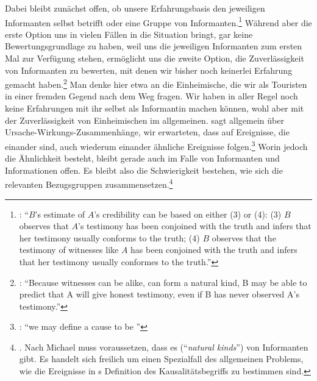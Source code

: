 Dabei bleibt zunächst offen, ob unsere Erfahrungsbasis den jeweiligen
Informanten selbst betrifft oder eine Gruppe von
Informanten.\footnote{\cite[Vgl.][20]{Root:HumeontheVirtuesofTestimony2001}:
\enquote{$B$’s estimate of $A$’s credibility can be based on either (3) or (4):
(3) $B$ observes that $A$’s testimony has been conjoined with the truth and
infers that her testimony usually conforms to the truth; (4) $B$ observes that
the testimony of witnesses like $A$ has been conjoined with the truth and infers
that her testimony usually conformes to the truth.}} Während aber die erste
Option uns in vielen Fällen in die Situation bringt, gar keine
Bewertungsgrundlage zu haben, weil uns die jeweiligen Informanten zum ersten Mal
zur Verfügung stehen, ermöglicht uns die zweite Option, die
Zuverlässigkeit von Informanten zu bewerten, mit denen wir bisher noch keinerlei
Erfahrung gemacht
haben.\footnote{\cite[Vgl.][20]{Root:HumeontheVirtuesofTestimony2001}:
\enquote{Because witnesses can be alike, can form a natural kind, B may be able
to predict that A will give honest testimony, even if B has never observed A’s
testimony.}} Man denke hier etwa an die Einheimische, die wir als Touristen in
einer fremden Gegend nach dem Weg fragen. Wir haben in aller Regel noch keine
Erfahrungen mit ihr selbst als Informantin machen können, wohl aber mit der
Zuverlässigkeit von Einheimischen im allgemeinen.  sagt allgemein
über Ursache-Wirkungs-Zusammenhänge, wir erwarteten, dass auf Ereignisse, die
einander  sind, auch wiederum einander ähnliche Ereignisse
folgen.\footnote{\cite[Vgl.][63]{Hume:AnEnquiryConcerningHumanUnderstanding1964}:
\enquote{we may define a cause to be }} Worin jedoch die Ähnlichkeit besteht, bleibt gerade auch im
Falle von Informanten und Informationen offen. Es bleibt also die Schwierigkeit
bestehen, wie sich die relevanten Bezugsgruppen
zusammensetzen.\footnote{\cite[Vgl.
hierzu][83--85]{Coady:Testimony1992}. Nach Michael
\textcite[vgl.][20]{Root:HumeontheVirtuesofTestimony2001} muss 
voraussetzen, dass es  (\enquote{\emph{natural
kinds}}) von Informanten gibt. Es handelt sich freilich um einen Spezialfall des
allgemeinen Problems, wie die  Ereignisse in s
Definition des Kausalitätsbegriffs zu bestimmen sind.}

